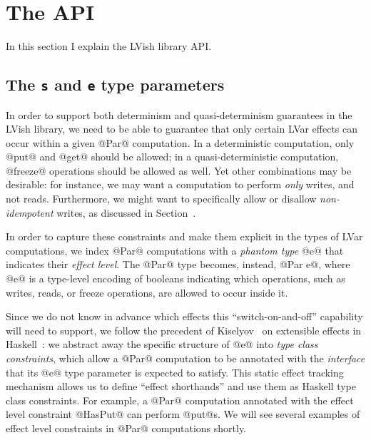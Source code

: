 \section{The API}\label{s:lvish-api}

In this section I explain the LVish library API. 

\subsection{The \lstinline|s| and \lstinline|e| type parameters}

In order to support both determinism and quasi-determinism guarantees
in the LVish library, we need to be able to guarantee that only
certain LVar effects can occur within a given @Par@ computation.  In a
deterministic computation, only @put@ and @get@ should be allowed; in
a quasi-deterministic computation, @freeze@ operations should be
allowed as well.  Yet other combinations may be desirable: for
instance, we may want a computation to perform \emph{only} writes, and
not reads.  Furthermore, we might want to specifically allow or
disallow \emph{non-idempotent} writes, as discussed in
Section~\label{s:lvars-generalizing}.

In order to capture these constraints and make them explicit in the
types of LVar computations, we index @Par@ computations with a
\emph{phantom type} @e@ that indicates their \emph{effect level}.  The
@Par@ type becomes, instead, @Par e@, where @e@ is a type-level
encoding of booleans indicating which operations, such as writes,
reads, or freeze operations, are allowed to occur inside it.

Since we do not know in advance which effects this
``switch-on-and-off'' capability will need to support, we follow the
precedent of Kiselyov \etal~on extensible effects in
Haskell~\cite{oleg-amr-haskell-2013}: we abstract away the specific
structure of @e@ into \emph{type class constraints}, which allow a
@Par@ computation to be annotated with the \emph{interface} that its
@e@ type parameter is expected to satisfy.  This static effect
tracking mechanism allows us to define ``effect shorthands'' and use
them as Haskell type class constraints.  For example, a @Par@
computation annotated with the effect level constraint @HasPut@ can
perform @put@s.  We will see several examples of effect level
constraints in @Par@ computations shortly.

